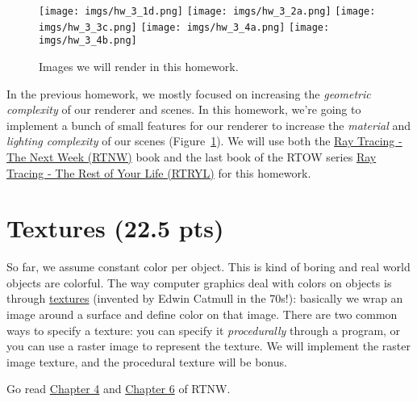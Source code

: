 
\usepackage{xcolor}




\begin{figure}[ht]
    \centering
    \texttt{[image: imgs/hw\_3\_1d.png]}
    \texttt{[image: imgs/hw\_3\_2a.png]}
    \texttt{[image: imgs/hw\_3\_3c.png]}
    \texttt{[image: imgs/hw\_3\_4a.png]}
    \texttt{[image: imgs/hw\_3\_4b.png]}
    \caption{Images we will render in this homework.}
    \label{fig:teaser}
\end{figure}

In the previous homework, we mostly focused on increasing the \emph{geometric complexity} of our renderer and scenes. In this homework, we're going to implement a bunch of small features for our renderer to increase the \emph{material} and \emph{lighting complexity} of our scenes (Figure~\ref{fig:teaser}). We will use both the \href{https://raytracing.github.io/books/RayTracingTheNextWeek.html}{Ray Tracing - The Next Week (RTNW)} book and the last book of the RTOW series \href{https://raytracing.github.io/books/RayTracingTheRestOfYourLife.html}{Ray Tracing - The Rest of Your Life (RTRYL)} for this homework.

\section{Textures (22.5 pts)}
So far, we assume constant color per object. This is kind of boring and real world objects are {\color{red}c}{\color{orange}o}{\color{green}l}{\color{blue}o}{\color{cyan}r}f{\color{magenta}u}{\color{violet}l}. The way computer graphics deal with colors on objects is through \href{https://en.wikipedia.org/wiki/Texture_mapping}{textures} (invented by Edwin Catmull in the 70s!): basically we wrap an image around a surface and define color on that image. There are two common ways to specify a texture: you can specify it \emph{procedurally} through a program, or you can use a raster image to represent the texture. We will implement the raster image texture, and the procedural texture will be bonus.

Go read \href{https://raytracing.github.io/books/RayTracingTheNextWeek.html#solidtextures}{Chapter 4} and \href{https://raytracing.github.io/books/RayTracingTheNextWeek.html#imagetexturemapping}{Chapter 6} of RTNW.

